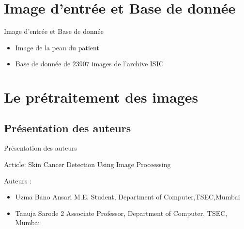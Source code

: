 \documentclass{beamer}
\begin{document}
\section{Image d'entrée et Base de donnée}
\begin{frame}{Image d'entrée et Base de donnée}
\begin{itemize}
		\item Image de la peau du patient
		\item Base de donnée de 23907 images de l'archive ISIC
\end{itemize}
\end{frame} 
\section{Le prétraitement des images}
\subsection{Présentation des auteurs}
\begin{frame}{Présentation des auteurs}
\par Article: Skin Cancer Detection Using Image Proceessing
\par Auteurs :
\begin{itemize}
		\item Uzma Bano Ansari M.E. Student, Department of Computer,TSEC,Mumbai
		\item Tanuja Sarode 2 Associate Professor, Department of Computer, TSEC, Mumbai
\end{itemize}
\end{frame}
\end{document}
